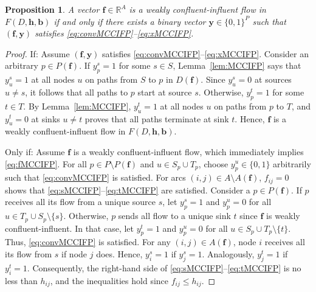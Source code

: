 \documentclass[pdflatex,sn-mathphys-num]{sn-jnl}%
\theoremstyle{thmstyleone}%
\newtheorem{proposition}[theorem]{Proposition}%
\begin{document}
\begin{proposition} \label{prop:MCCIFP}
A vector $\boldsymbol{f}\in\mathbb{R}^A$ is a weakly confluent-influent flow in $F(D,\boldsymbol{h},\boldsymbol{b})$ if and only if there exists a binary vector $\boldsymbol{y}\in\{0,1\}^P$ such that $(\boldsymbol{f},\boldsymbol{y})$ satisfies \eqref{eq:convMCCIFP}--\eqref{eq:xMCCIFP}.
\end{proposition}
\begin{proof}
If: Assume $(\boldsymbol{f},\boldsymbol{y})$ satisfies \eqref{eq:convMCCIFP}--\eqref{eq:xMCCIFP}.
Consider an arbitrary $p\in P(\boldsymbol{f})$.
If $y_p^s=1$ for some $s\in S$, Lemma~\ref{lem:MCCIFP} says that $y_u^s=1$ at all nodes $u$ on paths from $S$ to $p$ in $D(\boldsymbol{f})$.
Since $y_u^s=0$ at sources $u\neq s$, it follows that all paths to $p$ start at source $s$.
Otherwise, $y_p^t=1$ for some $t\in T$. By Lemma~\ref{lem:MCCIFP}, $y_u^t=1$ at all nodes $u$ on paths from $p$ to $T$, and $y_u^t=0$ at sinks $u\neq t$ proves that all paths terminate at sink $t$.
Hence, $\boldsymbol{f}$ is a weakly confluent-influent flow in $F(D,\boldsymbol{h},\boldsymbol{b})$.

Only if: Assume $\boldsymbol{f}$ is a weakly confluent-influent flow, which immediately implies \eqref{eq:fMCCIFP}.
For all $p\in P\setminus P(\boldsymbol{f})$ and $u\in S_p\cup T_p$, choose $y_p^u\in\{0,1\}$ arbitrarily such that \eqref{eq:convMCCIFP} is satisfied.
For arcs $(i,j)\in A\setminus A(\boldsymbol{f})$, $f_{ij}=0$ shows that \eqref{eq:sMCCIFP}--\eqref{eq:tMCCIFP} are satisfied.
Consider a $p\in P(\boldsymbol{f})$. If $p$ receives all its flow from a unique source $s$, let $y_p^s=1$ and $y_p^u=0$ for all $u\in T_p\cup S_p\setminus\{s\}$.
Otherwise, $p$ sends all flow to a unique sink $t$ since $\boldsymbol{f}$ is weakly confluent-influent.
In that case, let $y_p^t=1$ and $y_p^u=0$ for all $u\in S_p\cup T_p\setminus\{t\}$. Thus, \eqref{eq:convMCCIFP} is satisfied.
For any $(i,j)\in A(\boldsymbol{f})$, node $i$ receives all its flow from $s$ if node $j$ does.
Hence, $y_i^s=1$ if $y_j^s=1$. Analogously, $y_j^t=1$ if $y_i^t=1$.
Consequently, the right-hand side of \eqref{eq:sMCCIFP}--\eqref{eq:tMCCIFP} is no less than $h_{ij}$,
and the inequalities hold since $f_{ij}\leq h_{ij}$.
\end{proof}
\end{document}
